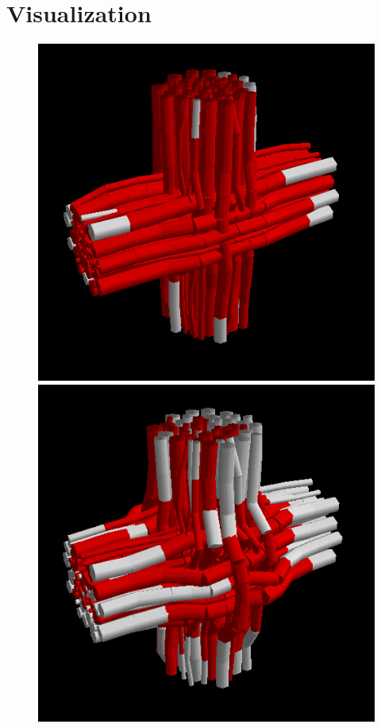 \section{Visualization}\label{sec:visualization}
% 
\begin{figure}[!t]
    \centering
    \setlength{\tikzwidth}{0.242\textwidth}
    \includegraphics[width=\tikzwidth]{gfx/fastpli/solver-10}\hfill
    \includegraphics[width=\tikzwidth]{gfx/fastpli/solver-20}\hfill

\end{figure}
